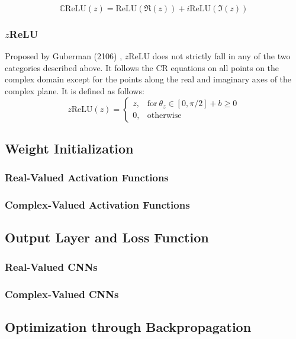 \begin{equation}
\label{eqcrelu}
\mathbb{C}\mathrm{ReLU}(z) = \mathrm{ReLU}(\Re(z))+i\mathrm{ReLU}(\Im(z))
\end{equation}

 
 
 \subsubsection{$z$ReLU}
 Proposed by Guberman (2106) \cite{Guberman}, $z$ReLU does not strictly fall in any of the two categories described above. It follows the CR equations on all points on the complex domain except for the points along the real and imaginary axes of the complex plane. It is defined as follows:
  \begin{equation}
  \label{eqzrelu}
 z\mathrm{ReLU}(z) 
 {}=\begin{cases} z , &\mathrm{for} \ \theta_{z} \in [0,\pi/2] + b\ge 0 \\ 0 , &\textrm{otherwise} \end{cases}
 \end{equation}

 \subsection{Weight Initialization}
 
 
 
 \subsubsection{Real-Valued Activation Functions}
 
 
 \subsubsection{Complex-Valued Activation Functions}
 
 
 \subsection{Output Layer and Loss Function}
 
 \subsubsection{Real-Valued CNNs}
 \subsubsection{Complex-Valued CNNs}
 
 \subsection{Optimization through Backpropagation}









